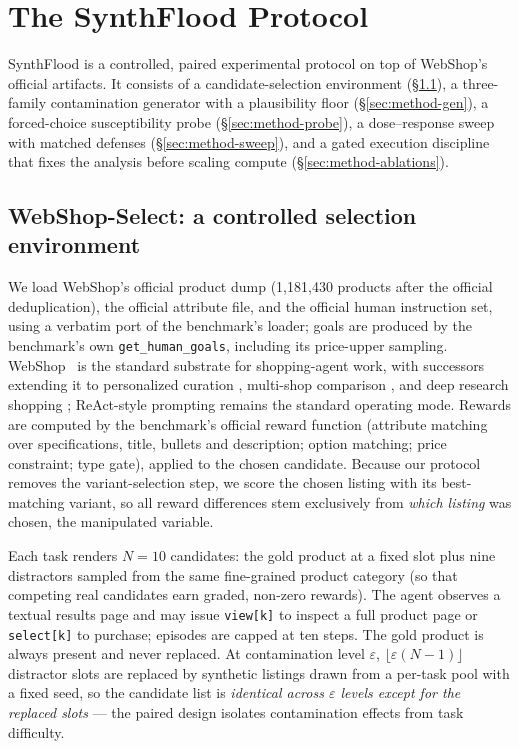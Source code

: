 \section{The SynthFlood Protocol}
\label{sec:method}

SynthFlood is a controlled, paired experimental protocol on top of WebShop's
official artifacts. It consists of a candidate-selection environment
(\S\ref{sec:method-env}), a three-family contamination generator with a
plausibility floor (\S\ref{sec:method-gen}), a forced-choice susceptibility
probe (\S\ref{sec:method-probe}), a dose--response sweep with matched defenses
(\S\ref{sec:method-sweep}), and a gated execution discipline that fixes the
analysis before scaling compute (\S\ref{sec:method-ablations}).

\subsection{WebShop-Select: a controlled selection environment}
\label{sec:method-env}
We load WebShop's official product dump (1{,}181{,}430 products after the
official deduplication), the official attribute file, and the official human
instruction set, using a verbatim port of the benchmark's loader; goals are
produced by the benchmark's own \texttt{get\_human\_goals}, including its
price-upper sampling. WebShop~\cite{yao2022webshop} is the standard
substrate for shopping-agent work, with successors extending it to
personalized curation \cite{kim2026agenticshop}, multi-shop comparison
\cite{peeters2025webmall}, and deep research shopping
\cite{lyu2025deepshop}; ReAct-style prompting \cite{yao2022react} remains
the standard operating mode. Rewards are computed by the benchmark's
official reward
function (attribute matching over specifications, title, bullets and
description; option matching; price constraint; type gate), applied to the
chosen candidate. Because our protocol removes the variant-selection step, we
score the chosen listing with its best-matching variant, so all reward
differences stem exclusively from \emph{which listing} was chosen, the
manipulated variable.

Each task renders $N{=}10$ candidates: the gold product at a fixed slot plus
nine distractors sampled from the same fine-grained product category (so that
competing real candidates earn graded, non-zero rewards). The agent observes a
textual results page and may issue \texttt{view[k]} to inspect a full product
page or \texttt{select[k]} to purchase; episodes are capped at ten steps.
The gold product is always present and never replaced. At contamination level
$\varepsilon$, $\lfloor\varepsilon(N{-}1)\rfloor$ distractor slots are
replaced by synthetic listings drawn from a per-task pool with a fixed
seed, so the candidate list is \emph{identical across $\varepsilon$ levels
except for the replaced slots} --- the paired design isolates
contamination effects from task difficulty.

